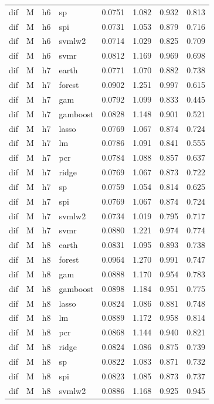 \begin{ThreePartTable}
\begin{longtable}[t]{llclcccc}
dif & M & h6 & sp & 0.0751 & 1.082 & 0.932 & 0.813\\
dif & M & h6 & spi & 0.0731 & 1.053 & 0.879 & 0.716\\
dif & M & h6 & svmlw2 & 0.0714 & 1.029 & 0.825 & 0.709\\
dif & M & h6 & svmr & 0.0812 & 1.169 & 0.969 & 0.698\\
\addlinespace
dif & M & h7 & earth & 0.0771 & 1.070 & 0.882 & 0.738\\
dif & M & h7 & forest & 0.0902 & 1.251 & 0.997 & 0.615\\
dif & M & h7 & gam & 0.0792 & 1.099 & 0.833 & 0.445\\
dif & M & h7 & gamboost & 0.0828 & 1.148 & 0.901 & 0.521\\
dif & M & h7 & lasso & 0.0769 & 1.067 & 0.874 & 0.724\\
dif & M & h7 & lm & 0.0786 & 1.091 & 0.841 & 0.555\\
dif & M & h7 & pcr & 0.0784 & 1.088 & 0.857 & 0.637\\
dif & M & h7 & ridge & 0.0769 & 1.067 & 0.873 & 0.722\\
dif & M & h7 & sp & 0.0759 & 1.054 & 0.814 & 0.625\\
dif & M & h7 & spi & 0.0769 & 1.067 & 0.874 & 0.724\\
dif & M & h7 & svmlw2 & 0.0734 & 1.019 & 0.795 & 0.717\\
dif & M & h7 & svmr & 0.0880 & 1.221 & 0.974 & 0.774\\
\addlinespace
dif & M & h8 & earth & 0.0831 & 1.095 & 0.893 & 0.738\\
dif & M & h8 & forest & 0.0964 & 1.270 & 0.991 & 0.747\\
dif & M & h8 & gam & 0.0888 & 1.170 & 0.954 & 0.783\\
dif & M & h8 & gamboost & 0.0898 & 1.184 & 0.951 & 0.775\\
dif & M & h8 & lasso & 0.0824 & 1.086 & 0.881 & 0.748\\
dif & M & h8 & lm & 0.0889 & 1.172 & 0.958 & 0.814\\
dif & M & h8 & pcr & 0.0868 & 1.144 & 0.940 & 0.821\\
dif & M & h8 & ridge & 0.0824 & 1.086 & 0.875 & 0.739\\
dif & M & h8 & sp & 0.0822 & 1.083 & 0.871 & 0.732\\
dif & M & h8 & spi & 0.0823 & 1.085 & 0.873 & 0.737\\
dif & M & h8 & svmlw2 & 0.0886 & 1.168 & 0.925 & 0.945\\

\end{longtable}
\end{ThreePartTable}

